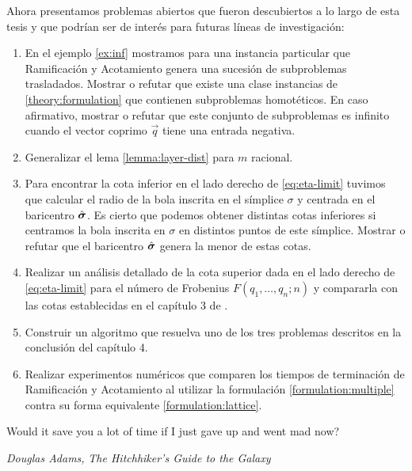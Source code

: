 Ahora presentamos problemas abiertos que fueron descubiertos a lo largo de esta tesis y que podrían
ser de interés para futuras líneas de investigación:
\begin{enumerate}
	\item En el ejemplo \ref{ex:inf} mostramos para una instancia particular que Ramificación y
		Acotamiento genera una sucesión de subproblemas trasladados. Mostrar o refutar que existe
		una clase instancias de \eqref{theory:formulation} que contienen subproblemas homotéticos.
		En caso afirmativo, mostrar o refutar que este conjunto de subproblemas es infinito cuando
		el vector coprimo $\vec{q}$ tiene una entrada negativa.
	\item Generalizar el lema \ref{lemma:layer-dist} para $m$ racional.
	\item Para encontrar la cota inferior en el lado derecho de \eqref{eq:eta-limit} tuvimos que calcular el
		radio de la bola inscrita en el símplice $\sigma$ y centrada en el baricentro $\hat{\boldsymbol{ \sigma }}$.
		Es cierto que podemos obtener distintas cotas inferiores si centramos la bola inscrita en
		$\sigma$ en distintos puntos de este símplice. Mostrar o refutar que el baricentro
		$\hat{\boldsymbol{ \sigma }}$ genera la menor de estas cotas.
	\item Realizar un análisis detallado de la cota superior dada en el lado derecho de
		\eqref{eq:eta-limit} para el número de Frobenius $F(q_1, \ldots, q_n ; n)$ y compararla con
		las cotas establecidas en el capítulo 3 de \cite{frob}.
	\item Construir un algoritmo que resuelva uno de los tres problemas descritos en la conclusión del capítulo
		4.
	\item Realizar experimentos numéricos que comparen los tiempos de terminación de Ramificación y
		Acotamiento al utilizar la formulación \eqref{formulation:multiple} contra su forma
		equivalente \eqref{formulation:lattice}.
\end{enumerate}

{

  \setlength{\epigraphwidth}{0.40\textwidth}
	\begin{flushright}
		\epigraph{Would it save you a lot of time if I just gave up and went mad now?}{\textit{Douglas
		Adams,} \emph{The Hitchhiker's Guide to the Galaxy}}
	\end{flushright}
}
